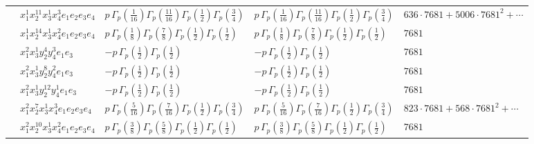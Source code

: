 \documentclass[11pt]{article}
\begin{document}
\begin{table}[ht]
{\begin{tabular}{@{}lllll@{}}
 & $x_{1}^{1} x_{2}^{11} x_{3}^{1} x_{4}^{3}  e_{1} e_{2} e_{3} e_{4}$ & $p \, \Gamma_p \left( \frac{1}{16} \right) \Gamma_p \left( \frac{11}{16} \right) \Gamma_p \left( \frac{1}{2} \right) \Gamma_p \left( \frac{3}{4} \right)$ & $p \, \Gamma_p \left( \frac{1}{16} \right) \Gamma_p \left( \frac{11}{16} \right) \Gamma_p \left( \frac{1}{2} \right) \Gamma_p \left( \frac{3}{4} \right)$ & $636{\cdot}7681{+}5006{\cdot}7681^{2}{+}\cdots$ \\
 & $x_{1}^{1} x_{2}^{14} x_{3}^{1} x_{4}^{2}  e_{1} e_{2} e_{3} e_{4}$ & $p \, \Gamma_p \left( \frac{1}{8} \right) \Gamma_p \left( \frac{7}{8} \right) \Gamma_p \left( \frac{1}{2} \right) \Gamma_p \left( \frac{1}{2} \right)$ & $p \, \Gamma_p \left( \frac{1}{8} \right) \Gamma_p \left( \frac{7}{8} \right) \Gamma_p \left( \frac{1}{2} \right) \Gamma_p \left( \frac{1}{2} \right)$ & $7681$ \\
 & $x_{1}^{2} x_{3}^{1} y_{2}^{4} y_{4}^{3} e_{1} e_{3}$ & $- p \, \Gamma_p \left( \frac{1}{2} \right) \Gamma_p \left( \frac{1}{2} \right)$ & $- p \, \Gamma_p \left( \frac{1}{2} \right) \Gamma_p \left( \frac{1}{2} \right)$ & $7681$ \\
 & $x_{1}^{2} x_{3}^{1} y_{2}^{8} y_{4}^{2} e_{1} e_{3}$ & $- p \, \Gamma_p \left( \frac{1}{2} \right) \Gamma_p \left( \frac{1}{2} \right)$ & $- p \, \Gamma_p \left( \frac{1}{2} \right) \Gamma_p \left( \frac{1}{2} \right)$ & $7681$ \\
 & $x_{1}^{2} x_{3}^{1} y_{2}^{12} y_{4}^{1} e_{1} e_{3}$ & $- p \, \Gamma_p \left( \frac{1}{2} \right) \Gamma_p \left( \frac{1}{2} \right)$ & $- p \, \Gamma_p \left( \frac{1}{2} \right) \Gamma_p \left( \frac{1}{2} \right)$ & $7681$ \\
 & $x_{1}^{2} x_{2}^{7} x_{3}^{1} x_{4}^{3}  e_{1} e_{2} e_{3} e_{4}$ & $p \, \Gamma_p \left( \frac{5}{16} \right) \Gamma_p \left( \frac{7}{16} \right) \Gamma_p \left( \frac{1}{2} \right) \Gamma_p \left( \frac{3}{4} \right)$ & $p \, \Gamma_p \left( \frac{5}{16} \right) \Gamma_p \left( \frac{7}{16} \right) \Gamma_p \left( \frac{1}{2} \right) \Gamma_p \left( \frac{3}{4} \right)$ & $823{\cdot}7681{+}568{\cdot}7681^{2}{+}\cdots$ \\
 & $x_{1}^{2} x_{2}^{10} x_{3}^{1} x_{4}^{2}  e_{1} e_{2} e_{3} e_{4}$ & $p \, \Gamma_p \left( \frac{3}{8} \right) \Gamma_p \left( \frac{5}{8} \right) \Gamma_p \left( \frac{1}{2} \right) \Gamma_p \left( \frac{1}{2} \right)$ & $p \, \Gamma_p \left( \frac{3}{8} \right) \Gamma_p \left( \frac{5}{8} \right) \Gamma_p \left( \frac{1}{2} \right) \Gamma_p \left( \frac{1}{2} \right)$ & $7681$ \\

\end{tabular}}
\end{table}
\end{document}
